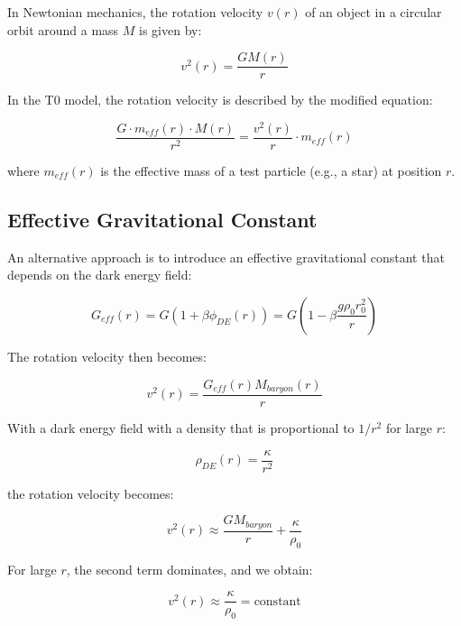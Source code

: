 \documentclass[a4paper,12pt]{article}
\begin{document}
	In Newtonian mechanics, the rotation velocity $v(r)$ of an object in a circular orbit around a mass $M$ is given by:
	
	\begin{equation}
		v^2(r) = \frac{GM(r)}{r}
	\end{equation}
	
	In the T0 model, the rotation velocity is described by the modified equation:
	
	\begin{equation}
		\frac{G \cdot m_{eff}(r) \cdot M(r)}{r^2} = \frac{v^2(r)}{r} \cdot m_{eff}(r)
	\end{equation}
	
	where $m_{eff}(r)$ is the effective mass of a test particle (e.g., a star) at position $r$.
	
	\subsection{Effective Gravitational Constant}
	
	An alternative approach is to introduce an effective gravitational constant that depends on the dark energy field:
	
	\begin{equation}
		G_{eff}(r) = G\left(1 + \beta\phi_{DE}(r)\right) = G\left(1 - \beta\frac{g\rho_0 r_0^2}{r}\right)
	\end{equation}
	
	The rotation velocity then becomes:
	
	\begin{equation}
		v^2(r) = \frac{G_{eff}(r)M_{baryon}(r)}{r}
	\end{equation}
	
	With a dark energy field with a density that is proportional to $1/r^2$ for large $r$:
	
	\begin{equation}
		\rho_{DE}(r) = \frac{\kappa}{r^2}
	\end{equation}
	
	the rotation velocity becomes:
	
	\begin{equation}
		v^2(r) \approx \frac{GM_{baryon}}{r} + \frac{\kappa}{\rho_0}
	\end{equation}
	
	For large $r$, the second term dominates, and we obtain:
	
	\begin{equation}
		v^2(r) \approx \frac{\kappa}{\rho_0} = \text{constant}
	\end{equation}
	
\end{document}
